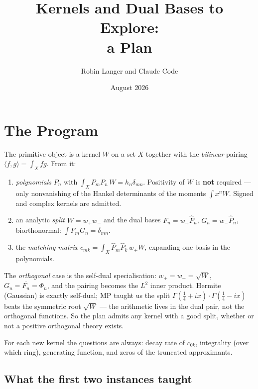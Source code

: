 \documentclass[11pt,a4paper]{article}
\title{\textbf{Kernels and Dual Bases to Explore:\\ a Plan}}
\author{Robin Langer and Claude Code}
\date{August 2026}
\begin{document}
\maketitle

\section{The Program}

The primitive object is a kernel $W$ on a set $X$ together with the
\emph{bilinear} pairing $\langle f,g\rangle = \int_X fg$. From it:
\begin{enumerate}
  \item \emph{polynomials} $P_n$ with
        $\int_X P_m P_n\, W = h_n \delta_{mn}$.
        Positivity of $W$ is \textbf{not} required --- only nonvanishing
        of the Hankel determinants of the moments $\int x^n W$. Signed
        and complex kernels are admitted.
  \item an analytic \emph{split} $W = w_+ w_-$ and the dual bases
        $F_n = w_+ \hat P_n$, $G_n = w_- \hat P_n$, biorthonormal:
        $\int F_m G_n = \delta_{mn}$.
  \item the \emph{matching matrix}
        $c_{mk} = \int_X \hat P_m \hat P_k\, w_+ W$,
        expanding one basis in the polynomials.
\end{enumerate}
The \emph{orthogonal} case is the self-dual specialisation: $w_+ = w_-
= \sqrt{W}$, $G_n = \overline{F_n} = \Phi_n$, and the pairing becomes
the $L^2$ inner product. Hermite (Gaussian) is exactly self-dual; MP
taught us the split $\Gamma(\tfrac14+ix)\cdot\Gamma(\tfrac14-ix)$ beats
the symmetric root $\sqrt{W}$ --- the arithmetic lives in the dual
pair, not the orthogonal functions. So the plan admits any kernel with
a good split, whether or not a positive orthogonal theory exists.

For each new kernel the questions are always: decay rate of $c_{0k}$,
integrality (over which ring), generating function, and zeros of the
truncated approximants.

\subsection*{What the first two instances taught}
\end{document}
